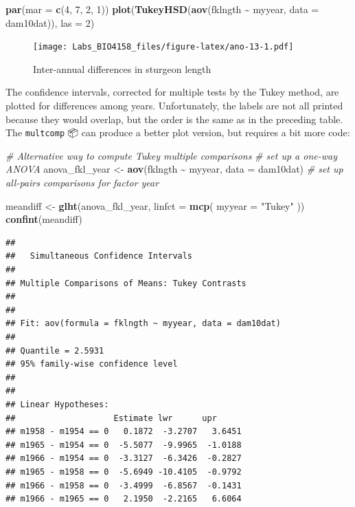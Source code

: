 \documentclass[
  12pt,
]{book}
\newenvironment{Shaded}{\begin{snugshade}}{\end{snugshade}}
\newcommand{\CommentTok}[1]{\textcolor[rgb]{0.56,0.35,0.01}{\textit{#1}}}
\newcommand{\DataTypeTok}[1]{\textcolor[rgb]{0.13,0.29,0.53}{#1}}
\newcommand{\DecValTok}[1]{\textcolor[rgb]{0.00,0.00,0.81}{#1}}
\newcommand{\KeywordTok}[1]{\textcolor[rgb]{0.13,0.29,0.53}{\textbf{#1}}}
\newcommand{\NormalTok}[1]{#1}
\newcommand{\OperatorTok}[1]{\textcolor[rgb]{0.81,0.36,0.00}{\textbf{#1}}}
\newcommand{\StringTok}[1]{\textcolor[rgb]{0.31,0.60,0.02}{#1}}
\begin{document}
\begin{Shaded}
\begin{Highlighting}[]
\KeywordTok{par}\NormalTok{(}\DataTypeTok{mar =} \KeywordTok{c}\NormalTok{(}\DecValTok{4}\NormalTok{, }\DecValTok{7}\NormalTok{, }\DecValTok{2}\NormalTok{, }\DecValTok{1}\NormalTok{))}
\KeywordTok{plot}\NormalTok{(}\KeywordTok{TukeyHSD}\NormalTok{(}\KeywordTok{aov}\NormalTok{(fklngth }\OperatorTok{\textasciitilde{}}\StringTok{ }\NormalTok{myyear, }\DataTypeTok{data =}\NormalTok{ dam10dat)), }\DataTypeTok{las =} \DecValTok{2}\NormalTok{)}
\end{Highlighting}
\end{Shaded}

\begin{figure}
\centering
\texttt{[image: Labs\_BIO4158\_files/figure-latex/ano-13-1.pdf]}
\caption{\label{fig:ano-13}Inter-annual differences in sturgeon length}
\end{figure}

The confidence intervals, corrected for multiple tests by the Tukey method, are plotted for differences among years. Unfortunately, the labels are not all printed because they would overlap, but the order is the same as in the preceding table. The \texttt{multcomp} 📦 can produce a better plot version, but requires a bit more code:

\begin{Shaded}
\begin{Highlighting}[]
\CommentTok{\# Alternative way to compute Tukey multiple comparisons}
\CommentTok{\# set up a one{-}way ANOVA}
\NormalTok{anova\_fkl\_year \textless{}{-}}\StringTok{ }\KeywordTok{aov}\NormalTok{(fklngth }\OperatorTok{\textasciitilde{}}\StringTok{ }\NormalTok{myyear, }\DataTypeTok{data =}\NormalTok{ dam10dat)}
\CommentTok{\# set up all{-}pairs comparisons for factor \textasciigrave{}year\textquotesingle{}}

\NormalTok{meandiff \textless{}{-}}\StringTok{ }\KeywordTok{glht}\NormalTok{(anova\_fkl\_year, }\DataTypeTok{linfct =} \KeywordTok{mcp}\NormalTok{(}
  \DataTypeTok{myyear =}
    \StringTok{"Tukey"}
\NormalTok{))}
\KeywordTok{confint}\NormalTok{(meandiff)}
\end{Highlighting}
\end{Shaded}

\begin{verbatim}
## 
##   Simultaneous Confidence Intervals
## 
## Multiple Comparisons of Means: Tukey Contrasts
## 
## 
## Fit: aov(formula = fklngth ~ myyear, data = dam10dat)
## 
## Quantile = 2.5931
## 95% family-wise confidence level
##  
## 
## Linear Hypotheses:
##                    Estimate lwr      upr     
## m1958 - m1954 == 0   0.1872  -3.2707   3.6451
## m1965 - m1954 == 0  -5.5077  -9.9965  -1.0188
## m1966 - m1954 == 0  -3.3127  -6.3426  -0.2827
## m1965 - m1958 == 0  -5.6949 -10.4105  -0.9792
## m1966 - m1958 == 0  -3.4999  -6.8567  -0.1431
## m1966 - m1965 == 0   2.1950  -2.2165   6.6064
\end{verbatim}
\end{document}
